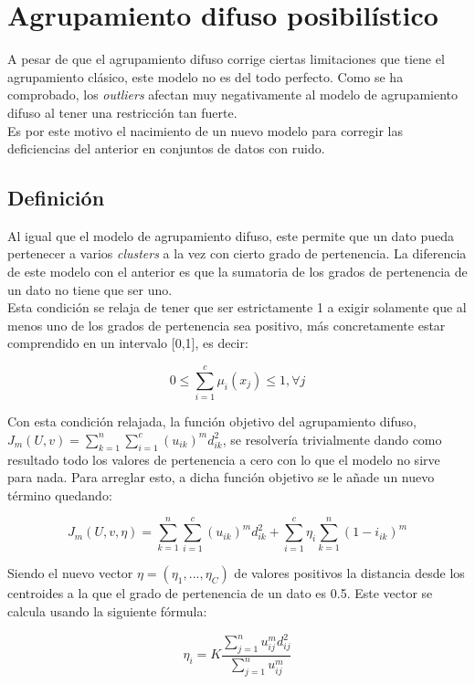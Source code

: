 \documentclass[]{report}
\begin{document}
	\chapter{Agrupamiento difuso posibilístico}
	
		A pesar de que el agrupamiento difuso corrige ciertas limitaciones que tiene el agrupamiento clásico, este modelo no es del todo perfecto. Como se ha comprobado, los \textit{outliers} afectan muy negativamente al modelo de agrupamiento difuso al tener una restricción tan fuerte.\\
		
		Es por este motivo el nacimiento de un nuevo modelo para corregir las deficiencias del anterior en conjuntos de datos con ruido.
	
		\section{Definición}
		
		Al igual que el modelo de agrupamiento difuso, este permite que un dato pueda pertenecer a varios \textit{clusters} a la vez con cierto grado de pertenencia. La diferencia de este modelo con el anterior es que la sumatoria de los grados de pertenencia de un dato no tiene que ser uno.\\
		
		Esta condición se relaja de tener que ser estrictamente 1 a exigir solamente que al menos uno de los grados de pertenencia sea positivo, más concretamente estar comprendido en un intervalo [0,1], es decir:
		
		$$ 0 \leq \sum_{i=1}^c\mu_i(x_j) \leq 1, \forall j $$
		
		Con esta condición relajada, la función objetivo del agrupamiento difuso, $J_m(U,v) = \sum_{k=1}^n \sum_{i=1}^c (u_{ik})^m d^2_{ik}$, se resolvería trivialmente dando como resultado todo los valores de pertenencia a cero con lo que el modelo no sirve para nada. Para arreglar esto, a dicha función objetivo se le añade un nuevo término quedando:
		
		$$J_m(U,v,\eta) = \sum_{k=1}^n \sum_{i=1}^c (u_{ik})^m d^2_{ik} + \sum_{i=1}^c \eta _i \sum_{k=1}^n (1-i_{ik})^m$$
		
		Siendo el nuevo vector $\eta = (\eta_1,...,\eta_C)$ de valores positivos la distancia desde los centroides a la que el grado de pertenencia de un dato es 0.5. Este vector se calcula usando la siguiente fórmula:
		
		$$\eta_i = K \frac{\sum_{j=1}^n u_{ij}^m d_{ij}^2}{\sum_{j=1}^n u_{ij}^m}$$
		
\end{document}
